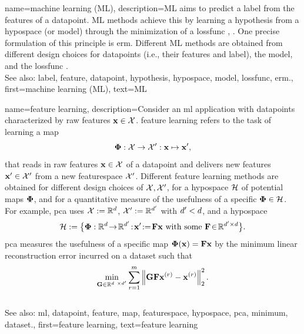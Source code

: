 {name={machine learning (ML)},
		 description={ML aims to predict 
	 a \gls{label} from the \glspl{feature} of a \gls{datapoint}. ML methods achieve 
	 this by learning a \gls{hypothesis} from a \gls{hypospace} (or \gls{model}) 
	 through the minimization of a \gls{lossfunc} \cite{MLBasics}, \cite{HastieWainwrightBook}. 
	 One precise formulation of this principle is \gls{erm}. Different ML methods are 
	 obtained from different design choices for \glspl{datapoint} (i.e., their \glspl{feature} and \gls{label}), 
	 the \gls{model}, and the \gls{lossfunc} \cite[Ch. 3]{MLBasics}.
	 			\\ 
		See also: \gls{label}, \gls{feature}, \gls{datapoint}, \gls{hypothesis}, \gls{hypospace}, \gls{model}, \gls{lossfunc}, \gls{erm}.},
	first={machine learning (ML)},
	text={ML}
} 


{name={feature learning},
	description={Consider an \gls{ml} application with \glspl{datapoint} characterized by 
		raw \glspl{feature} ${\bf x} \in \mathcal{X}$. \Gls{feature} learning 
		refers to the task of learning a \gls{map} 
		$${\bf \Phi}: \mathcal{X} \rightarrow \mathcal{X}': {\bf x} \mapsto {\bf x}',$$ 
		that reads in raw \glspl{feature} ${\bf x} \in \mathcal{X}$ of a \gls{datapoint} and delivers new 
		\glspl{feature} ${\bf x}' \in \mathcal{X}'$ from a new \gls{featurespace} $\mathcal{X}'$. 
		Different \gls{feature} learning methods are obtained for different design 
		choices of $\mathcal{X},\mathcal{X}'$, for a \gls{hypospace} $\mathcal{H}$ 
		of potential \glspl{map} ${\bf \Phi}$, and for a quantitative measure of the usefulness of 
		a specific ${\bf \Phi} \in \mathcal{H}$. For example, \gls{pca} 
		uses $\mathcal{X} := \mathbb{R}^{d}$, $\mathcal{X}' := \mathbb{R}^{d'}$ 
		with $d' < d$, and a \gls{hypospace} 
		$$\hypospace\defeq \big\{ \featuremapvec: \mathbb{R}^{\dimlocalmodel}
		\!\rightarrow\! \mathbb{R}^{\dimlocalmodel'}\!:\!\featurevec'\!\defeq\!\mF \featurevec \mbox{ with some } \mF \!\in\! \mathbb{R}^{\dimlocalmodel' \times \dimlocalmodel} \big\}.$$ \Gls{pca} measures the usefulness of a specific \gls{map} ${\bf \Phi}({\bf x})= \mathbf{F} {\bf x}$ 
	by the \gls{minimum} linear reconstruction error incurred on a \gls{dataset} such that 
$$ \min_{\mG \in \mathbb{R}^{\dimlocalmodel \times \dimlocalmodel'}} \sum_{\sampleidx=1}^{\samplesize} \normgeneric{\mG \mF \featurevec^{(\sampleidx)} - \featurevec^{(\sampleidx)}}{2}^{2}.$$ 
			\\ 
		See also: \gls{ml}, \gls{datapoint}, \gls{feature}, \gls{map}, \gls{featurespace}, \gls{hypospace}, \gls{pca}, \gls{minimum}, \gls{dataset}.}, 
	first={feature learning},
	text={feature learning}
} 

